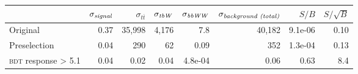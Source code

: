 \begin{tabular}{lrrrrrrr}
\toprule
{} &  $\sigma_\text{\emph{signal}}$ &  $\sigma_{t\overline{t}}$ &  $\sigma_\text{\emph{tbW}}$
   &  $\sigma_\text{\emph{bbWW}}$ &  $\sigma_\text{\emph{background (total)}}$ &   $S/B$ &  $S/\sqrt{B}$ \\
\midrule
Original           &               0.37 &          35,998 &           4,176 &              7.8 &             40,182 & 9.1e-06 &          0.10 \\
Preselection &               0.04 &             290 &              62 &             0.09 &                352 & 1.3e-04 &          0.13 \\
\textsc{bdt} response > 5.1      &               0.04 &            0.02 &            0.04 &          4.8e-04 &               0.06 &    0.63 &           8.4 \\
\bottomrule
\end{tabular}
